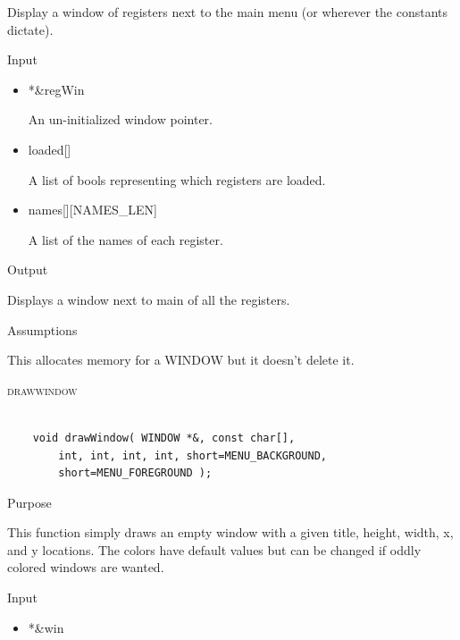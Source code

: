 \documentclass[pdftex, 11pt]{article}
\begin{document}
\begin{description}
\begin{description}
 				Display a window of registers next to the main menu (or wherever the constants
				dictate).

			\item{Input}
			
				\begin{itemize}

					\item{*\&regWin}
						
						An un-initialized window pointer.

					\item{loaded[]}

						A list of bools representing which registers are loaded.

					\item{names[][NAMES\_LEN]}

						A list of the names of each register.

				\end{itemize}

			\item{Output}

				Displays a window next to main of all the registers.

			\item{Assumptions}

				This allocates memory for a WINDOW but it doesn't delete it.

		\end{description}


	\item{\textsc{drawwindow}}

		\begin{lstlisting}

	void drawWindow( WINDOW *&, const char[], 
		int, int, int, int, short=MENU_BACKGROUND, 
		short=MENU_FOREGROUND );
		\end{lstlisting}

		\begin{description}
			\item{Purpose}

				This function simply draws an empty window with a given title, height, width,
				x, and y locations.  The colors have default values but can be changed if
				oddly colored windows are wanted.

			\item{Input}

				\begin{itemize}

					\item{*\&win}


\end{itemize}
\end{description}
\end{description}
\end{document}
